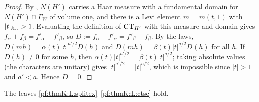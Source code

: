 \begin{proof}
By , $N(H')$ carries a Haar measure with a fundamental domain for
$N(H')\cap\Gamma_W$ of volume one, and there is a Levi element $m=m(t,1)$ with $|t|_{\mathbb{A}_E}>1$. Evaluating the
definition of $\operatorname{CT}_{H'}$ with this measure and domain gives $f_\alpha+f_\beta=f'_\alpha+f'_\beta$, so
$D:=f_\alpha-f'_\alpha=f'_\beta-f_\beta$. By the laws, $D(mh)=\alpha(t)|t|^{a'/2}D(h)$ and
$D(mh)=\beta(t)|t|^{a/2}D(h)$ for all $h$. If $D(h)\ne0$ for some $h$, then $\alpha(t)|t|^{a'/2}=\beta(t)|t|^{a/2}$;
taking absolute values (the characters are unitary) gives $|t|^{a'/2}=|t|^{a/2}$, which is impossible since $|t|>1$ and
$a'<a$. Hence $D=0$.
\end{proof}

\begin{proposition}\label{pf:thmK:ctleaves}
The leaves \ref{pf:thmK:L:splitex}--\ref{pf:thmK:L:ctsc} hold.
\end{proposition}

